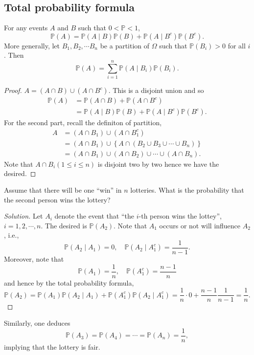 \documentclass[11pt,singlecolumn, openany, citestyle=authoryear]{elegantbook}
\begin{document}
\begin{CJK}{UTF8}{gbsn}
\subsection{Total probability formula}
\begin{theorem}
    For any events $A$ and $B$ such that $0 < \mathbb{P} < 1$,
    $$
    \mathbb{P}(A) = \mathbb{P}(A \mid B)\mathbb{P}(B) + 
    \mathbb{P}(A \mid B^c)\mathbb{P}(B^c).  
    $$
    More generally, let $B_1,B_2,\cdots B_n$ be a partition of $\Omega$ such that 
    $\mathbb{P}(B_i)>0$ for all $i$. Then 
    $$
    \mathbb{P}(A) = \sum_{i=1}^n \mathbb{P}(A\mid B_i)\mathbb{P}(B_i).
    $$
\end{theorem}
\begin{proof}
    $A = (A \cap B)\cup (A \cap B^c)$. This is a disjoint union and so 
    \begin{align*}
        \mathbb{P}(A) &= \mathbb{P}(A \cap B) + \mathbb{P}(A \cap B^c) \\
        &= \mathbb{P}(A \mid B)\mathbb{P}(B) + \mathbb{P}(A \mid B^c)\mathbb{P}(B^c).
    \end{align*}
    For the second part, recall the definiton of partition, 
    \begin{align*}
        A &= (A \cap B_1) \cup (A \cap B_1^c) \\
        &= (A \cap B_1) \cup \left\{A \cap (B_2 \cup B_3 \cup \cdots \cup B_n )\right\}\\
        &= (A \cap B_1) \cup (A\cap B_2) \cup \cdots \cup (A \cap B_n).
    \end{align*}
    Note that $A\cap B_i (1 \leqslant i \leqslant n)$ is disjoint two by two hence we have the desired.
\end{proof}

\begin{example}[(Lottery)]
    Assume that there will be one ``win'' in $n$ lotteries. What is the probability that 
    the second person wins the lottery?    
\end{example}
\begin{proof}[Solution]
    Let $A_i$ denote the event that ``the $i$-th person wins the lottey'', $i=1,2,\cdots,n$.
    The desired is $\mathbb{P}(A_2)$. Note that $A_1$ occurs or not will influence $A_2$,
    i.e.,
    $$
    \mathbb{P}(A_2 \mid A_1)=0,\quad \mathbb{P}(A_2 \mid A_1^c) = \frac{1}{n-1}.
    $$ 
    Moreover, note that 
    $$
    \mathbb{P}(A_1)=\frac{1}{n},\quad \mathbb{P}(A_1^c)=\frac{n-1}{n}
    $$
    and hence by the total probability formula,
    $$
    \mathbb{P}(A_2)=\mathbb{P}(A_1)\mathbb{P}(A_2 \mid A_1) + 
    \mathbb{P}(A_1^c)\mathbb{P}(A_2\mid A_1^c) = 
    \frac{1}{n}\cdot 0 + \frac{n-1}{n}\frac{1}{n-1}=\frac{1}{n}.
    $$
\end{proof}
    Similarly, one deduces 
    $$
    \mathbb{P}(A_3)=\mathbb{P}(A_4)=\cdots =\mathbb{P}(A_n)=\frac{1}{n},
    $$
    implying that the lottery is fair.


\end{CJK}
\end{document}
